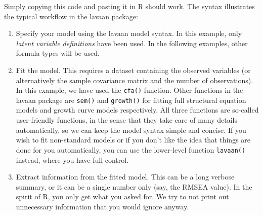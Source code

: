 Simply copying this code and pasting it in R should work. The syntax
illustrates the typical workflow in the lavaan package:

\begin{enumerate}
\def\labelenumi{\arabic{enumi}.}
\item
  Specify your model using the lavaan model syntax. In this example,
  only \emph{latent variable definitions} have been used. In the
  following examples, other formula types will be used.
\item
  Fit the model. This requires a dataset containing the observed
  variables (or alternatively the sample covariance matrix and the
  number of observations). In this example, we have used the
  \texttt{cfa()} function. Other functions in the lavaan package are
  \texttt{sem()} and \texttt{growth()} for fitting full structural
  equation models and growth curve models respectively. All three
  functions are so-called user-friendly functions, in the sense that
  they take care of many details automatically, so we can keep the model
  syntax simple and concise. If you wish to fit non-standard models or
  if you don't like the idea that things are done for you automatically,
  you can use the lower-level function \texttt{lavaan()} instead, where
  you have full control.
\item
  Extract information from the fitted model. This can be a long verbose
  summary, or it can be a single number only (say, the RMSEA value). In
  the spirit of R, you only get what you asked for. We try to not print
  out unnecessary information that you would ignore anyway.
\end{enumerate}
